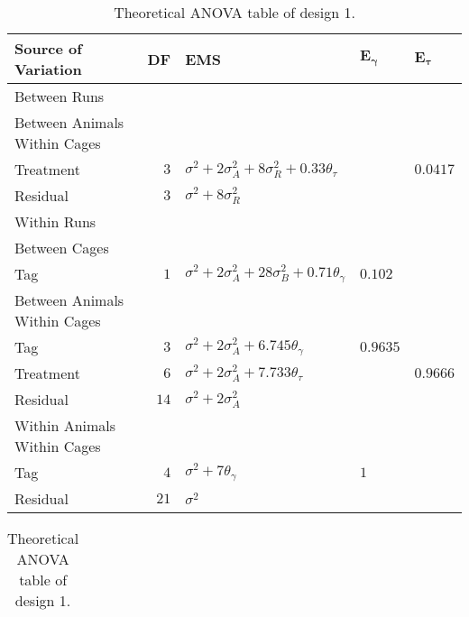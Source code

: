 \begin{table}[h!]
\centering
 \caption{Theoretical ANOVA table of design 1.}
 \begin{tabular}[t]{lrlll} 
 \toprule 
 \multicolumn{1}{l}{\textbf{Source of Variation}} & \multicolumn{1}{l}{\textbf{DF}} & \multicolumn{1}{l}{\textbf{EMS}}& \multicolumn{1}{l}{$\bm{E_{\gamma}}$}&\multicolumn{1}{l}{$\bm{E_{\tau}}$}\\ 
 \midrule 
 Between Runs &  &  & & \\ 
 \quad Between Animals Within Cages &  &  & & \\ 
 \quad \quad Treatment & $3$ & $\sigma^2+2\sigma_{A}^2+8\sigma_{R}^2+0.33\theta_{\tau}$ & & $0.0417$\\ 
 \quad Residual & $3$ & $\sigma^2+8\sigma_{R}^2$ & & \\ \hline
 Within Runs &  &  & & \\ 
 \quad Between Cages &  &  & & \\ 
 \quad \quad Tag & $1$ & $\sigma^2+2\sigma_{A}^2+28\sigma_{B}^2+ 0.71\theta_{\gamma}$ &$0.102$ & \\ \hline
 \quad Between Animals Within Cages &  &  & & \\ 
 \quad \quad Tag & $3$ & $\sigma^2+2\sigma_{A}^2+6.745\theta_{\gamma}$ &$0.9635$ & \\ 
 \quad \quad Treatment & $6$ & $\sigma^2+2\sigma_{A}^2+ 7.733\theta_{\tau}$ & & $0.9666$\\ 
 \quad \quad Residual & $14$ & $\sigma^2+2\sigma_{A}^2$ & & \\ \hline
 \quad Within Animals Within Cages &  &  & & \\ 
 \quad \quad Tag & $4$ & $\sigma^2+7\theta_{\gamma}$ &$1$ & \\ 
 \quad \quad Residual & $21$ & $\sigma^2$ & & \\ 
 \bottomrule 
 \end{tabular} 
 \label{tab:Phase2ANOVA7} 

\begin{tabular}{l}
 	\\	
 \end{tabular} 
 

\end{table}
